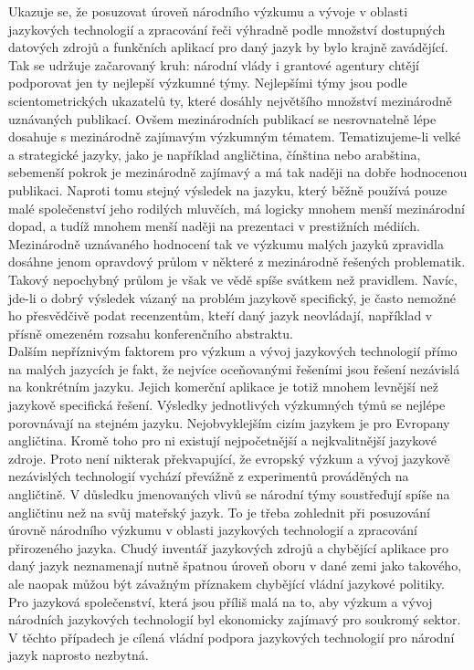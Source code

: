 \begin{multicols}{2}
Ukazuje se, že posuzovat úroveň národního výzkumu a vývoje v oblasti jazykových technologií a zpracování řeči výhradně podle množství dostupných datových zdrojů a funkčních aplikací pro daný jazyk by bylo krajně zavádějící. Tak se udržuje začarovaný kruh: národní vlády i grantové agentury chtějí podporovat jen ty nejlepší výzkumné týmy. Nejlepšími týmy jsou podle scientometrických ukazatelů ty, které dosáhly největšího množství mezinárodně uznávaných publikací. Ovšem mezinárodních publikací se nesrovnatelně lépe dosahuje s mezinárodně zajímavým výzkumným tématem. Tematizujeme-li velké a strategické jazyky, jako je například angličtina, čínština nebo arabština, sebemenší pokrok je mezinárodně zajímavý a má tak naději na dobře hodnocenou publikaci. Naproti tomu stejný výsledek na jazyku, který běžně používá pouze malé společenství jeho rodilých mluvčích, má logicky mnohem menší mezinárodní dopad, a tudíž mnohem menší naději na prezentaci v prestižních médiích. Mezinárodně uznávaného hodnocení tak ve výzkumu malých jazyků zpravidla dosáhne jenom opravdový průlom v některé z mezinárodně řešených problematik. Takový nepochybný průlom je však ve vědě spíše svátkem než pravidlem. Navíc, jde-li o dobrý výsledek vázaný na problém jazykově specifický, je často nemožné ho přesvědčivě podat recenzentům, kteří daný jazyk neovládají, například v přísně omezeném rozsahu konferenčního abstraktu.\\
Dalším nepříznivým faktorem pro výzkum a vývoj jazykových technologií přímo na malých jazycích je fakt, že nejvíce oceňovanými řešeními jsou řešení nezávislá na konkrétním jazyku. Jejich komerční aplikace je totiž mnohem levnější než jazykově specifická řešení. Výsledky jednotlivých výzkumných týmů se nejlépe porovnávají na stejném jazyku. Nejobvyklejším cizím jazykem je pro Evropany angličtina. Kromě toho pro ni existují nejpočetnější a nejkvalitnější jazykové zdroje. Proto není nikterak překvapující, že evropský výzkum a vývoj jazykově nezávislých technologií vychází převážně z experimentů prováděných na angličtině.
V důsledku jmenovaných vlivů se národní týmy soustřeďují spíše na angličtinu než na svůj mateřský jazyk. To je třeba zohlednit při posuzování úrovně národního výzkumu v oblasti jazykových technologií a zpracování přirozeného jazyka. Chudý inventář jazykových zdrojů a chybějící aplikace pro daný jazyk neznamenají nutně špatnou úroveň oboru v dané zemi jako takového, ale naopak můžou být závažným příznakem chybějící vládní jazykové politiky. Pro jazyková společenství, která jsou příliš malá na to, aby výzkum a vývoj národních jazykových technologií byl ekonomicky zajímavý pro soukromý sektor. V těchto případech je cílená vládní podpora jazykových technologií pro národní jazyk naprosto nezbytná.


\end{multicols}
